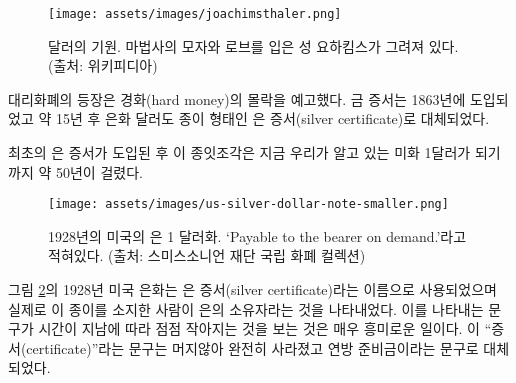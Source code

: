 \begin{figure}
  \centering
  \texttt{[image: assets/images/joachimsthaler.png]}
  \caption{달러의 기원. 마법사의 모자와 로브를 입은 성 요하킴스가 그려져 있다. (출처: 위키피디아)}
  \label{fig:joachimsthaler}
\end{figure}

\begin{comment}
The introduction of representative money heralded the downfall of hard
money. Gold certificates were introduced in 1863, and about fifteen
years later, the silver dollar was also slowly but surely being replaced
by a paper proxy: the silver certificate. \cite{wiki:silver-certificate}
\end{comment}
대리화폐의 등장은 경화(hard money)의 몰락을 예고했다. 
금 증서는 1863년에 도입되었고 약 15년 후 은화 달러도 종이 형태인 은 증서(silver certificate)로 대체되었다.\cite{wiki:silver-certificate}

\begin{comment}
It took about 50 years from the introduction of the first silver
certificates until these pieces of paper morphed into something that we
would today recognize as one U.S. dollar.
\end{comment}
최초의 은 증서가 도입된 후 이 종잇조각은 
지금 우리가 알고 있는 미화 1달러가 되기까지 약 50년이 걸렸다.

\begin{figure}
  \centering
  \texttt{[image: assets/images/us-silver-dollar-note-smaller.png]}
  \caption{1928년의 미국의 은 1 달러화. `Payable to the bearer on demand.'라고 적혀있다. (출처: 스미스소니언 재단 국립 화폐 컬렉션)}
  \label{fig:us-silver-dollar-note-smaller}
\end{figure}

\begin{comment}
Note that the 1928 U.S. silver dollar in
Figure~\ref{fig:us-silver-dollar-note-smaller} still goes by the name of
\textit{silver certificate}, indicating that this is indeed simply a document
stating that the bearer of this piece of paper is owed a piece of silver. It is
interesting to see that the text which indicates this got smaller over time. The
trace of \enquote{certificate} vanished completely after a while, being replaced
by the reassuring statement that these are federal reserve notes.
\end{comment}
그림 \ref{fig:us-silver-dollar-note-smaller}의 1928년 미국 은화는 은 증서(silver certificate)라는
이름으로 사용되었으며 실제로 이 종이를 소지한 사람이 은의 소유자라는 것을 나타내었다. 
이를 나타내는 문구가 시간이 지남에 따라 점점 작아지는 것을 보는 것은 매우 흥미로운 일이다. 
이 \enquote{증서(certificate)}라는 문구는 머지않아 완전히 사라졌고 연방 준비금이라는 문구로 대체되었다.


